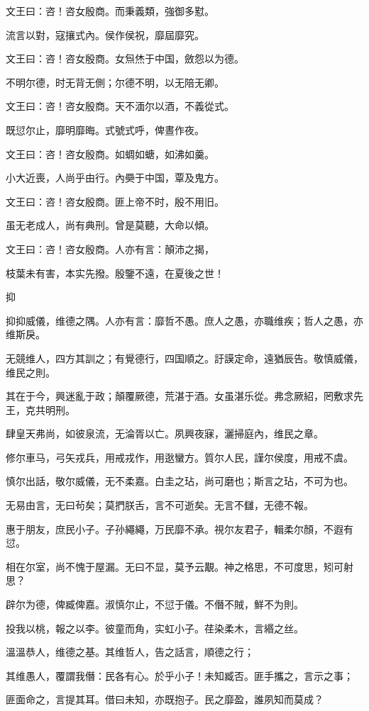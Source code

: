 文王曰：咨！咨女殷商。而秉義類，強御多懟。

流言以對，寇攘式內。侯作侯祝，靡屆靡究。

文王曰：咨！咨女殷商。女炰烋于中国，斂怨以为德。

不明尔德，时无背无側；尔德不明，以无陪无卿。

文王曰：咨！咨女殷商。天不湎尔以酒，不義從式。

既愆尔止，靡明靡晦。式號式呼，俾晝作夜。

文王曰：咨！咨女殷商。如蜩如螗，如沸如羹。

小大近喪，人尚乎由行。內奰于中国，覃及鬼方。

文王曰：咨！咨女殷商。匪上帝不时，殷不用旧。

虽无老成人，尚有典刑。曾是莫聽，大命以傾。

文王曰：咨！咨女殷商。人亦有言：顛沛之揭，

枝葉未有害，本实先撥。殷鑒不遠，在夏後之世！

抑

抑抑威儀，维德之隅。人亦有言：靡哲不愚。庶人之愚，亦職维疾；哲人之愚，亦维斯戾。

无競维人，四方其訓之；有覺德行，四国順之。訏謨定命，遠猶辰告。敬慎威儀，维民之則。

其在于今，興迷亂于政；顛覆厥德，荒湛于酒。女虽湛乐從。弗念厥紹，罔敷求先王，克共明刑。

肆皇天弗尚，如彼泉流，无淪胥以亡。夙興夜寐，灑掃庭內，维民之章。

修尔車马，弓矢戎兵，用戒戎作，用逖蠻方。質尔人民，謹尔侯度，用戒不虞。

慎尔出話，敬尔威儀，无不柔嘉。白圭之玷，尚可磨也；斯言之玷，不可为也。

无易由言，无曰茍矣；莫捫朕舌，言不可逝矣。无言不讎，无德不報。

惠于朋友，庶民小子。子孙繩繩，万民靡不承。視尔友君子，輯柔尔顏，不遐有愆。

相在尔室，尚不愧于屋漏。无曰不显，莫予云覯。神之格思，不可度思，矧可射思？

辟尔为德，俾臧俾嘉。淑慎尔止，不愆于儀。不僭不賊，鮮不为則。

投我以桃，報之以李。彼童而角，实虹小子。荏染柔木，言緡之丝。

溫溫恭人，维德之基。其维哲人，告之話言，順德之行；

其维愚人，覆謂我僭：民各有心。於乎小子！未知臧否。匪手攜之，言示之事；

匪面命之，言提其耳。借曰未知，亦既抱子。民之靡盈，誰夙知而莫成？

